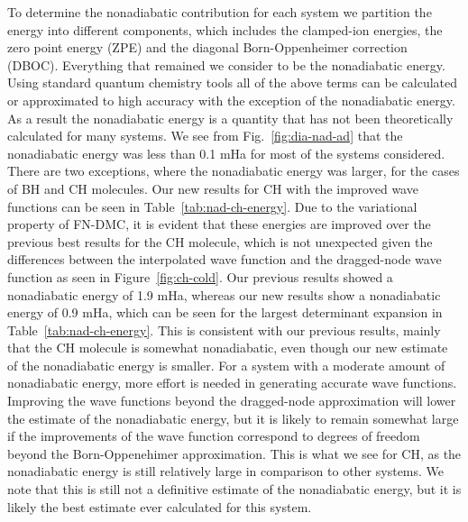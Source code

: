 To determine the nonadiabatic
contribution for each system we partition the energy into different components,
which includes the clamped-ion energies, the zero point energy (ZPE) and the
diagonal Born-Oppenheimer correction (DBOC). Everything that remained we
consider to be the nonadiabatic energy. Using standard quantum chemistry tools
all of the above terms can be calculated or approximated to high accuracy with
the exception of the nonadiabatic energy. As a result the nonadiabatic energy is
a quantity that has not been theoretically calculated for many systems. We see from Fig.~\ref{fig:dia-nad-ad} that the nonadiabatic energy was less than 0.1 mHa for most of the
systems considered. There are two exceptions, where the nonadiabatic energy
was larger, for the cases of BH and CH molecules.
Our new results for CH with the improved wave functions can be seen in Table~\ref{tab:nad-ch-energy}. Due to the variational property of FN-DMC, it is evident that these energies
are improved over the previous best results for the CH molecule, which is not
unexpected given the differences between the interpolated wave function and the
dragged-node wave function as seen in Figure~\ref{fig:ch-cold}. Our previous results showed a
nonadiabatic energy of 1.9 mHa, whereas our new results show a nonadiabatic energy of
0.9 mHa, which can be seen for the largest determinant expansion in Table~\ref{tab:nad-ch-energy}. This
is consistent with our previous results, mainly that the CH molecule is somewhat
nonadiabatic, even though our new estimate of the nonadiabatic energy is smaller.
For a system with a moderate amount of nonadiabatic energy, more effort is needed
in generating accurate wave functions. Improving the wave functions beyond the
dragged-node approximation will lower the estimate of the nonadiabatic energy,
but it is likely to remain somewhat large if the improvements of the wave function
correspond to degrees of freedom beyond the Born-Oppenehimer approximation.
This is what we see for CH, as the nonadiabatic energy is still relatively large in
comparison to other systems. We note that this is still not a definitive estimate of
the nonadiabatic energy, but it is likely the best estimate ever calculated for this
system.

